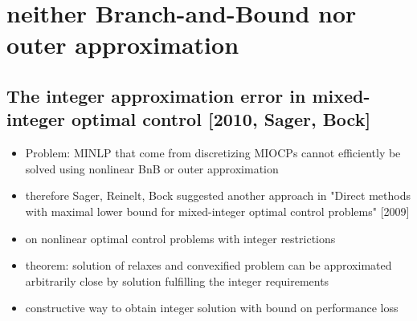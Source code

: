 \documentclass{article}
\begin{document}
\newpage
\section{neither Branch-and-Bound nor outer approximation}
\subsection{The integer approximation error in mixed-integer optimal control [2010, Sager, Bock]}
\begin{itemize}
\item Problem: MINLP that come from discretizing MIOCPs cannot efficiently be solved using nonlinear BnB or outer approximation
\item therefore Sager, Reinelt, Bock suggested another approach in "Direct methods with maximal lower bound for mixed-integer optimal control problems" [2009]
\item on nonlinear optimal control problems with integer restrictions
\item theorem: solution of relaxes and convexified problem can be approximated arbitrarily close by solution fulfilling the integer requirements
\item constructive way to obtain integer solution with bound on performance loss
\end{itemize}
\end{document}

